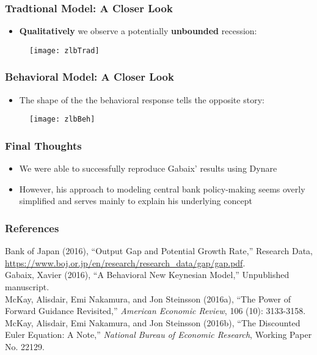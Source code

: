 \documentclass{beamer}
\begin{document}

\begin{frame}
	\frametitle{Tradtional Model: A Closer Look}
	\begin{itemize}
		\item \textbf{Qualitatively} we observe a potentially \textbf{unbounded} recession: 
	\end{itemize}
	\begin{figure}[h]
		\texttt{[image: zlbTrad]}
	\end{figure}	
\end{frame}


\begin{frame}
	\frametitle{Behavioral Model: A Closer Look}
	\begin{itemize}
		\item The shape of the the behavioral response tells the opposite story:
	\end{itemize}
	\begin{figure}[h]
		\texttt{[image: zlbBeh]}
	\end{figure}	
\end{frame}


\begin{frame}
	\frametitle{Final Thoughts}
	\begin{itemize}
		\item We were able to successfully reproduce Gabaix' results using Dynare
		\vspace{8pt}
		\item However, his approach to modeling central bank policy-making seems overly simplified and serves mainly to explain his underlying concept 
	\end{itemize}
\end{frame}


\begin{frame}
	\frametitle{References}
	\begin{flushleft}
		\footnotesize
		Bank of Japan (2016), ``Output Gap and Potential Growth Rate,'' Research Data, \url{https://www.boj.or.jp/en/research/research\_data/gap/gap.pdf}.\\
		\vspace{7pt}
		Gabaix, Xavier (2016), ``A Behavioral New Keynesian Model,'' Unpublished manuscript.\\
		\vspace{7pt}
		McKay, Alisdair, Emi Nakamura, and Jon Steinsson (2016a), ``The Power of Forward Guidance Revisited,'' \textit{American Economic Review}, 106 (10): 3133-3158.\\
		\vspace{7pt}
		McKay, Alisdair, Emi Nakamura, and Jon Steinsson (2016b), ``The Discounted Euler Equation: A Note,'' \textit{National Bureau of Economic Research}, Working Paper No. 22129.
	\end{flushleft}
\end{frame}

\end{document}
